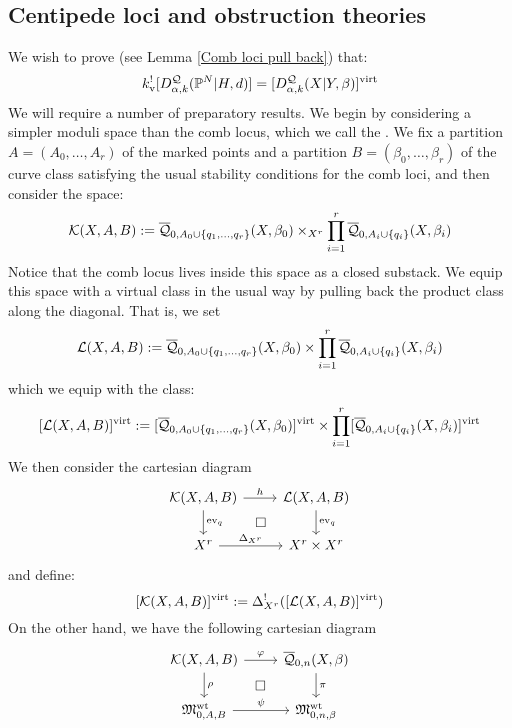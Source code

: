 \subsection{Centipede loci and obstruction theories}
 We wish to prove (see Lemma \ref{Comb loci pull back}) that:
\begin{equation*} k_{\text{v}}^! [D^\mathcal{Q}_{\alpha,k}(\mathbb P^N|H,d)] = [D^\mathcal{Q}_{\alpha,k}(X|Y,\beta)]^{\operatorname{virt}} \end{equation*}
We will require a number of preparatory results. We begin by considering a simpler moduli space than the comb locus, which we call the . We fix a partition $A=(A_0,\ldots,A_r)$ of the marked points and a partition $B=(\beta_0, \ldots, \beta_r)$ of the curve class satisfying the usual stability conditions for the comb loci, and then consider the space:
\begin{equation*} \mathcal{K}(X,A,B) := \overline{\mathcal Q}_{0,A_0 \cup \{ q_1, \ldots, q_r \}}(X,\beta_0) \times_{X^r} \prod_{i=1}^r \overline{\mathcal Q}_{0,A_i\cup\{q_i\}}(X,\beta_i) \end{equation*}
Notice that the comb locus lives inside this space as a closed substack. We equip this space with a virtual class in the usual way by pulling back the product class along the diagonal. That is, we set
\begin{equation*} \mathcal{L}(X,A,B) :=  \overline{\mathcal Q}_{0,A_0 \cup \{ q_1, \ldots, q_r \}}(X,\beta_0) \times \prod_{i=1}^r \overline{\mathcal Q}_{0,A_i\cup\{q_i\}}(X,\beta_i) \end{equation*}
which we equip with the class:
\begin{equation*} [\mathcal{L}(X,A,B)]^{\operatorname{virt}} := [\overline{\mathcal Q}_{0,A_0 \cup \{ q_1, \ldots, q_r \}}(X,\beta_0)]^{\operatorname{virt}} \times \prod_{i=1}^r [\overline{\mathcal Q}_{0,A_i\cup\{q_i\}}(X,\beta_i)]^{\operatorname{virt}} \end{equation*}
We then consider the cartesian diagram
\begin{equation} \label{Product diagram}
\begin{tikzcd}
\mathcal{K}(X,A,B) \ar[r,"h"] \ar[d,"\ev_q"] \ar[rd,phantom,"\square"] & \mathcal{L}(X,A,B) \ar[d,"\ev_q"] \\
X^r \ar[r,"\Delta_{X^r}"] & X^r \times X^r
\end{tikzcd}
\end{equation}
and define:
\begin{equation*} [\mathcal{K}(X,A,B)]^{\operatorname{virt}} := \Delta_{X^r}^! ([\mathcal{L}(X,A,B)]^{\operatorname{virt}}) \end{equation*}
On the other hand, we have the following cartesian diagram
\begin{equation} \label{Full quasimap diagram}
\begin{tikzcd}
\mathcal{K}(X,A,B) \ar[r,"\varphi"] \ar[d,"\rho"] \ar[rd,phantom,"\square"] & \Q{0}{n}{X}{\beta} \ar[d,"\pi"] \\
\MM_{0,A,B}^{\operatorname{wt}} \ar[r,"\psi"] & \MM_{0,n,\beta}^{\operatorname{wt}}
\end{tikzcd}
\end{equation}
